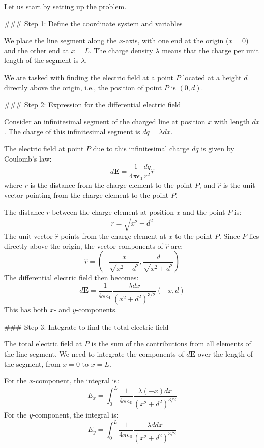 Let us start by setting up the problem.

### Step 1: Define the coordinate system and variables

We place the line segment along the \( x \)-axis, with one end at the origin (\( x = 0 \)) and the other end at \( x = L \). The charge density \( \lambda \) means that the charge per unit length of the segment is \( \lambda \). 

We are tasked with finding the electric field at a point \( P \) located at a height \( d \) directly above the origin, i.e., the position of point \( P \) is \( (0, d) \).

### Step 2: Expression for the differential electric field

Consider an infinitesimal segment of the charged line at position \( x \) with length \( dx \). The charge of this infinitesimal segment is \( dq = \lambda dx \).

The electric field at point \( P \) due to this infinitesimal charge \( dq \) is given by Coulomb's law:
\[
d\mathbf{E} = \frac{1}{4\pi \epsilon_0} \frac{dq}{r^2} \hat{r}
\]
where \( r \) is the distance from the charge element to the point \( P \), and \( \hat{r} \) is the unit vector pointing from the charge element to the point \( P \).

The distance \( r \) between the charge element at position \( x \) and the point \( P \) is:
\[
r = \sqrt{x^2 + d^2}
\]
The unit vector \( \hat{r} \) points from the charge element at \( x \) to the point \( P \). Since \( P \) lies directly above the origin, the vector components of \( \hat{r} \) are:
\[
\hat{r} = \left( -\frac{x}{\sqrt{x^2 + d^2}}, \frac{d}{\sqrt{x^2 + d^2}} \right)
\]
The differential electric field then becomes:
\[
d\mathbf{E} = \frac{1}{4\pi \epsilon_0} \frac{\lambda dx}{(x^2 + d^2)^{3/2}} \left( -x, d \right)
\]
This has both \( x \)- and \( y \)-components.

### Step 3: Integrate to find the total electric field

The total electric field at \( P \) is the sum of the contributions from all elements of the line segment. We need to integrate the components of \( d\mathbf{E} \) over the length of the segment, from \( x = 0 \) to \( x = L \).

For the \( x \)-component, the integral is:
\[
E_x = \int_0^L \frac{1}{4\pi \epsilon_0} \frac{\lambda (-x) dx}{(x^2 + d^2)^{3/2}}
\]
For the \( y \)-component, the integral is:
\[
E_y = \int_0^L \frac{1}{4\pi \epsilon_0} \frac{\lambda d dx}{(x^2 + d^2)^{3/2}}
\]

